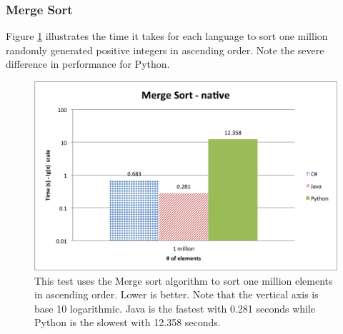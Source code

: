 \subsubsection{Merge Sort}

Figure \ref{fig:native_merge_sort} illustrates the time it takes for each language to sort one million randomly generated positive integers in ascending order. Note the severe difference in performance for Python.

\begin{figure}[h]
	\centering
	\includegraphics[width=1.0\linewidth]{chapters/new_media/MergeSortNative.png}
	\caption{This test uses the Merge sort algorithm to sort one million elements in ascending order. Lower is better. Note that the vertical axis is base 10 logarithmic. Java is the fastest with 0.281 seconds while Python is the slowest with 12.358 seconds.}
	\label{fig:native_merge_sort}
\end{figure}
